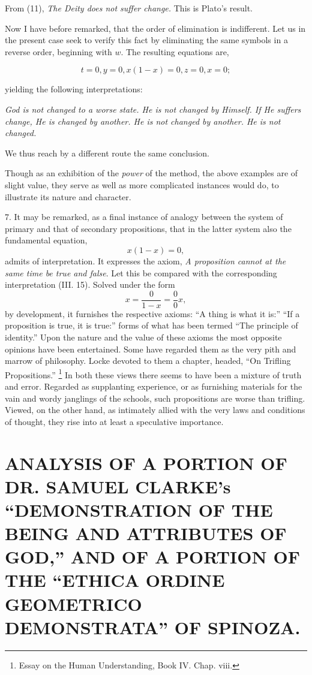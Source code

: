 \documentclass[oneside]{book}
\begin{document}
From (11), \textit{The Deity does not suffer change.} This is Plato's
result.

Now I have before remarked, that the order of elimination
is indifferent. Let us in the present case seek to verify this fact
by eliminating the same symbols in a reverse order, beginning
with $w$. The resulting equations are,

\[
t=0, y = 0, x(1-x) = 0, z = 0, x = 0;
\]

yielding the following interpretations:

\textit{God is not changed to a worse state.
He is not changed by Himself.
If He suffers change, He is changed by another.
He is not changed by another.
He is not changed.
}

We thus reach by a different route the same conclusion.

Though as an exhibition of the \textit{power} of the method, the
above examples are of slight value, they serve as well as more
complicated instances would do, to illustrate its nature and character.

7. It may be remarked, as a final instance of analogy between
the system of primary and that of secondary propositions, that
in the latter system also the fundamental equation,
\[
x (1 - x) = 0,
\]
admits of interpretation. It expresses the axiom, \textit{A proposition
cannot at the same time be true and false}. Let this be compared
with the corresponding interpretation (III. 15). Solved under
the form
\[
x=\frac{0}{1-x}=\frac{0}{0}x,
\]
by development, it furnishes the respective axioms: ``A thing is
what it is:'' ``If a proposition is true, it is true:'' forms of what has
been termed ``The principle of identity.'' Upon the nature and
the value of these axioms the most opposite opinions have been
entertained. Some have regarded them as the very pith and marrow
of philosophy. Locke devoted to them a chapter, headed,
``On Trifling Propositions.''
\footnote{Essay on the Human Understanding, Book IV. Chap. viii.}
In both these views there seems
to have been a mixture of truth and error. Regarded as supplanting
experience, or as furnishing materials for the vain and
wordy janglings of the schools, such propositions are worse than
trifling. Viewed, on the other hand, as intimately allied with
the very laws and conditions of thought, they rise into at least a
speculative importance.


\chapter[CLARKE AND SPINOZA]
{\large ANALYSIS OF A PORTION OF DR. SAMUEL CLARKE's ``DEMONSTRATION
OF THE BEING AND ATTRIBUTES OF GOD,'' AND OF A
PORTION OF THE ``ETHICA ORDINE GEOMETRICO DEMONSTRATA''
OF SPINOZA. }
\end{document}
